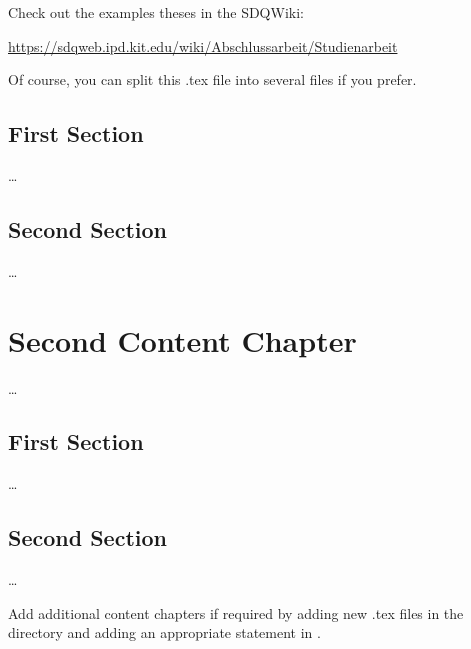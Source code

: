 Check out the examples theses in the SDQWiki:

\url{https://sdqweb.ipd.kit.edu/wiki/Abschlussarbeit/Studienarbeit}

Of course, you can split this .tex file into several files if you prefer. 


\section{First Section}
\label{sec:FirstContent:FirstSection}

\dots

\section{Second Section}
\label{sec:FirstContent:SecondSection}

\dots


\chapter{Second Content Chapter}
\label{ch:SecondContent}

\dots

\section{First Section}
\label{sec:SecondContent:FirstSection}

\dots

\section{Second Section}
\label{sec:SecondContent:SecondSection}

\dots

Add additional content chapters if required by adding new .tex files in the
 directory and adding an appropriate 
 statement in . 
\fi
